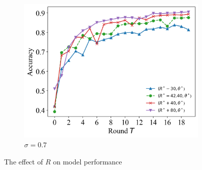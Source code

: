 \documentclass{article}
\theoremstyle{plain}
\theoremstyle{definition}
\theoremstyle{remark}
\begin{document}
\begin{figure}
\begin{subfigure}{0.31\textwidth}
		\includegraphics[width=\textwidth]{figures/figure_74_C.png}
    \caption{$\sigma=0.7$}
	\end{subfigure}
	\caption{The effect of $R$ on model performance}
\end{figure}
\end{document}
